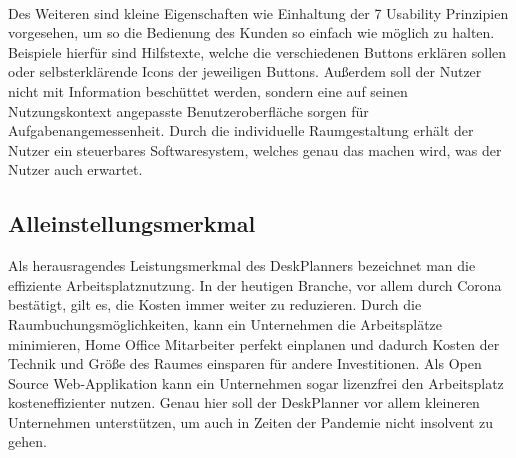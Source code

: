\paragraph{} Des Weiteren sind kleine Eigenschaften wie Einhaltung der 7 Usability Prinzipien vorgesehen, um so die Bedienung des Kunden so einfach wie möglich zu halten. 
Beispiele hierfür sind Hilfstexte, welche die verschiedenen Buttons erklären sollen oder selbsterklärende Icons der jeweiligen Buttons. 
Außerdem soll der Nutzer nicht mit Information beschüttet werden, sondern eine auf seinen Nutzungskontext angepasste Benutzeroberfläche sorgen für Aufgabenangemessenheit. 
Durch die individuelle Raumgestaltung erhält der Nutzer ein steuerbares Softwaresystem, welches genau das machen wird, was der Nutzer auch erwartet.

\subsection{Alleinstellungsmerkmal}
Als herausragendes Leistungsmerkmal des DeskPlanners bezeichnet man die effiziente Arbeitsplatznutzung. 
In der heutigen Branche, vor allem durch Corona bestätigt, gilt es, die Kosten immer weiter zu reduzieren. 
Durch die Raumbuchungsmöglichkeiten, kann ein Unternehmen die Arbeitsplätze minimieren, Home Office Mitarbeiter perfekt einplanen und dadurch Kosten der Technik und Größe des Raumes einsparen für andere Investitionen. 
Als Open Source Web-Applikation kann ein Unternehmen sogar lizenzfrei den Arbeitsplatz kosteneffizienter nutzen.
Genau hier soll der DeskPlanner vor allem kleineren Unternehmen unterstützen, um auch in Zeiten der Pandemie nicht insolvent zu gehen.
